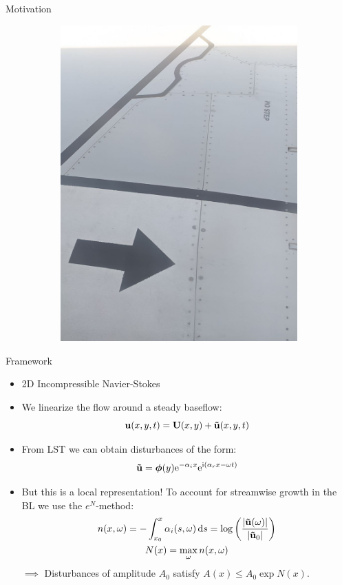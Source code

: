 \documentclass[aspectratio=43, xcolor=table]{beamer}
\begin{document}
\begin{frame}{Motivation}
\begin{figure}
\begin{subfigure}{0.45\textwidth}
			\includegraphics[width=\textwidth]{Images/wing_closer.jpg}
		\end{subfigure}

	\end{figure}
\end{frame}
\begin{frame}{Framework}

	\begin{itemize}
		\item 2D Incompressible Navier-Stokes\pause
		\item We linearize the flow around a steady baseflow: $$\boldsymbol{\mathrm{u}}(x,y,t) = \boldsymbol{\mathrm{U}}(x,y)+ \boldsymbol{\mathrm{\tilde{u}}}(x,y,t)$$\pause
		\item From LST we can obtain disturbances of the form: $$\boldsymbol{\mathrm{\tilde{u}}} = \boldsymbol{\mathrm{\phi}}(y) \mathrm{e}^{ -\alpha_i x } \mathrm{e}^{ \mathrm{i} (\alpha_r x - \omega t) }$$\pause
		\item But this is a local representation! To account for streamwise growth in the BL we use the $e^N$-method:
		      \begin{gather*}
			      n(x, \omega) = -\int_{x_0}^{x} \alpha_i(s,\omega)\dd{s} = \log\left( \frac{\abs{\boldsymbol{\mathrm{\tilde{u}}}(\omega)}}{\abs{\boldsymbol{\mathrm{\tilde{u}}}_0}} \right) \\
			      N(x) = \max_{\omega} n(x, \omega)
		      \end{gather*}\pause
		      $\implies$ Disturbances of amplitude $A_0$ satisfy $A(x) \leq A_0 \exp{N(x)}$.
	\end{itemize}

\end{frame}
\end{document}
